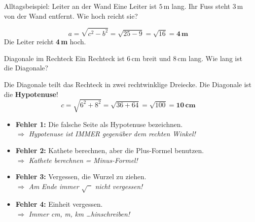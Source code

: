 \documentclass[12pt, a4paper]{article}
\begin{document}
\begin{examplebox}{Alltagsbeispiel: Leiter an der Wand}
Eine Leiter ist $5$\,m lang. Ihr Fuss steht $3$\,m von der Wand entfernt.
Wie hoch reicht sie?

\begin{center}
\end{center}

\[
  a = \sqrt{c^2 - b^2} = \sqrt{25 - 9} = \sqrt{16} = \mathbf{4\,m}
\]
Die Leiter reicht \textbf{4\,m} hoch.
\end{examplebox}

\begin{examplebox}{Diagonale im Rechteck}
Ein Rechteck ist $6$\,cm breit und $8$\,cm lang. Wie lang ist die Diagonale?

Die Diagonale teilt das Rechteck in zwei rechtwinklige Dreiecke.
Die Diagonale ist die \textbf{Hypotenuse}!
\[
  c = \sqrt{6^2 + 8^2} = \sqrt{36 + 64} = \sqrt{100} = \mathbf{10\,cm}
\]
\end{examplebox}

\begin{fehlerbox}
\begin{itemize}
  \item \textbf{Fehler 1:} Die falsche Seite als Hypotenuse bezeichnen.\\
    $\Rightarrow$ \textit{Hypotenuse ist IMMER gegen\"uber dem rechten Winkel!}
  \item \textbf{Fehler 2:} Kathete berechnen, aber die Plus-Formel benutzen.\\
    $\Rightarrow$ \textit{Kathete berechnen = Minus-Formel!}
  \item \textbf{Fehler 3:} Vergessen, die Wurzel zu ziehen.\\
    $\Rightarrow$ \textit{Am Ende immer $\sqrt{\phantom{x}}$ nicht vergessen!}
  \item \textbf{Fehler 4:} Einheit vergessen.\\
    $\Rightarrow$ \textit{Immer cm, m, km \ldots hinschreiben!}
\end{itemize}
\end{fehlerbox}
\end{document}

